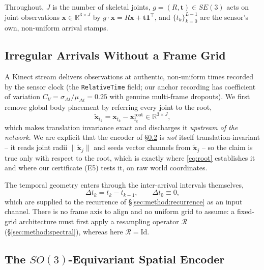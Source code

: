 Throughout, $J$ is the number of skeletal joints, $g=(R,\bm{t})\in SE(3)$ acts on joint observations
$\bm{x}\in\mathbb{R}^{3\times J}$ by $g\cdot\bm{x}=R\bm{x}+\bm{t}\mathbf{1}^{\!\top}$, and
$\{t_k\}_{k=0}^{L-1}$ are the sensor's own, non-uniform arrival stamps.

\subsection{Irregular Arrivals Without a Frame Grid}
\label{sec:method:irregular}

A Kinect stream delivers observations at authentic, non-uniform times recorded by the sensor clock
(the \texttt{RelativeTime} field; our anchor recording has coefficient of variation
$C_V=\sigma_{\Delta t}/\mu_{\Delta t}=0.25$ with genuine multi-frame dropouts). We first remove global
body placement by referring every joint to the root,
%
\begin{equation}
\label{eq:root}
\tilde{\bm{x}}_{t_k}=\bm{x}_{t_k}-\bm{x}^{\text{root}}_{t_k}\in\mathbb{R}^{3\times J},
\end{equation}
%
which makes translation invariance exact and discharges it \emph{upstream of the network}. We are
explicit that the encoder of \S\ref{sec:method:encoder} is \emph{not} itself translation-invariant --
it reads joint radii $\|\tilde{\bm{x}}_j\|$ and seeds vector channels from $\tilde{\bm{x}}_j$ -- so
the claim is true only with respect to the root, which is exactly where
\eqref{eq:root} establishes it and where our certificate (E5) tests it, on raw world coordinates.

The temporal geometry enters through the inter-arrival intervals themselves,
%
\begin{equation}
\label{eq:dt}
\Delta t_k = t_k - t_{k-1},\qquad \Delta t_0 \equiv 0 ,
\end{equation}
%
which are supplied to the recurrence of \S\ref{sec:method:recurrence} as an input channel. There is no
frame axis to align and no uniform grid to assume: a fixed-grid architecture must first apply a
resampling operator $\mathcal{R}$ (\S\ref{sec:method:spectral}), whereas here
$\mathcal{R}=\mathrm{Id}$.

\subsection{The $SO(3)$-Equivariant Spatial Encoder}
\label{sec:method:encoder}

